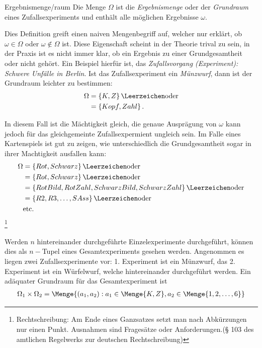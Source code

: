 \begin{Definition}{Ergebnismenge/raum}
	Die Menge $\Omega$ ist die \textit{Ergebnismenge} oder der \textit{Grundraum} eines Zufallsexperiments und enthält alle möglichen Ergebnisse $\omega$.
\end{Definition}

Dies Definition greift einen naiven Mengenbegriff auf, welcher nur erklärt, ob $\omega\in\Omega$ oder $\omega\notin\Omega$ ist. Diese Eigenschaft scheint in der Theorie trival zu sein, in der Praxis ist es nicht immer klar, ob ein Ergebnis zu einer Grundgesamtheit oder nicht gehört. Ein Beispiel hierfür ist, das \textit{Zufallsvorgang (Experiment): Schwere Unfälle in Berlin}. Ist das Zufallsexperiment ein \textit{Münzwurf}, dann ist der Grundraum leichter zu bestimmen:
\begin{align*}
	\Omega &= \left\lbrace K,Z \right\rbrace \Leerzeichen \text{oder} \\
		&= \left\lbrace Kopf, Zahl \right\rbrace.
\end{align*}

In diesem Fall ist die Mächtigkeit gleich, die genaue Ausprägung von $\omega$ kann jedoch für das gleichgemeinte Zufallsexpermient ungleich sein. Im Falle eines Kartenspiels ist gut zu zeigen, wie unterschiedlich die Grundgesamtheit sogar in ihrer Machtigkeit ausfallen kann: 
\begin{align*}
	\Omega &= \left\lbrace Rot, Schwarz \right\rbrace \Leerzeichen \text{oder} 
	\\
	&= \left\lbrace Rot, Schwarz \right\rbrace \Leerzeichen \text{oder} \\
	&= \left\lbrace RotBild, RotZahl, SchwarzBild, SchwarzZahl  \right\rbrace \Leerzeichen \text{oder}\\
	&= \left\lbrace R2, R3, \dots, SAss \right\rbrace \Leerzeichen \text{oder} \\
	&\text{etc.}
\end{align*}\footnote{Rechtschreibung: Am Ende eines Ganzsatzes setzt man nach Abkürzungen nur einen Punkt. Ausnahmen sind Fragesätze oder Anforderungen.(§ 103 des amtlichen Regelwerks zur deutschen Rechtschreibung)}

Werden $n$ hintereinander durchgeführte Einzelexperimente durchgeführt, können dies als $n-$Tupel eines Gesamtexperiments gesehen werden. Angenommen es liegen zwei Zufallsexperimente vor: 1. Experiment ist ein Münzwurf, das 2. Experiment ist ein Würfelwurf, welche hintereinander durchgeführt werden. Ein adäquater Grundraum für das Gesamtexperiment ist
\begin{align*}
	\Omega_1 \times \Omega_2 = \Menge{(a_1, a_2): a_1 \in \Menge{K,Z}, a_2\in \Menge{1,2, \dots , 6}}
\end{align*}

